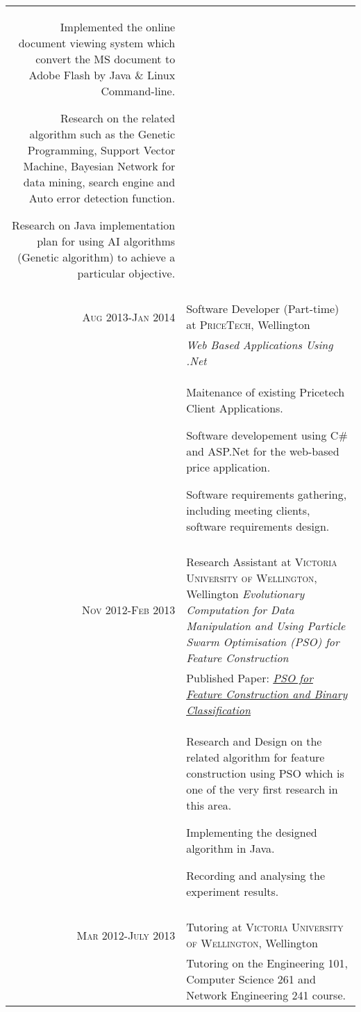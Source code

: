 \documentclass[a4paper,10pt]{article} %
\begin{document}
\begin{tabular}{r|p{11cm}}
{Implemented the online document viewing system which convert the MS document to Adobe Flash by Java \& Linux Command-line.

Research on the related algorithm such as the Genetic Programming, Support Vector Machine, Bayesian Network for data mining, search engine and Auto error detection function.

Research on Java implementation plan for using AI algorithms (Genetic algorithm) to achieve a particular objective.
}\\
\multicolumn{2}{c}{} \\


\textsc{Aug 2013-Jan 2014} & Software Developer (Part-time) at \textsc{PriceTech}, Wellington \\
& \emph{Web Based Applications Using .Net}\\ 
& \footnotesize{
Maitenance of existing Pricetech Client Applications.

Software developement using C\# and ASP.Net for the web-based price application.

Software requirements gathering, including meeting clients, software requirements design.
}\\
\multicolumn{2}{c}{} \\



\textsc{Nov 2012-Feb 2013} & Research Assistant at \textsc{Victoria University of Wellington}, Wellington \emph{Evolutionary Computation for Data Manipulation and Using Particle Swarm Optimisation (PSO) for Feature Construction}\\
& Published Paper: \emph{\href{http://dl.acm.org/citation.cfm?id=2463376}{PSO for Feature Construction and Binary Classification}}\\
& \footnotesize{
Research and Design on the related algorithm for feature construction using PSO which is one of the very first research in this area. 

Implementing the designed algorithm in Java.

Recording and analysing the experiment results.
}\\
\multicolumn{2}{c}{} \\


\textsc{Mar 2012-July 2013} & Tutoring at \textsc{Victoria University of Wellington}, Wellington \emph{}\\
& \footnotesize{
Tutoring on the Engineering 101, Computer Science 261 and Network Engineering 241 course.

}
\end{tabular}
\end{document}
